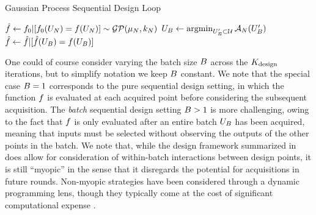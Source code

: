 \documentclass[12pt]{article}
\begin{document}
\begin{algorithm}
    \caption{Gaussian Process Sequential Design Loop}
    \label{alg:seq_des_loop}
    \begin{algorithmic}[1] %
	\State $\hat{\func} \gets \funcPrior|[\funcPrior(\designIn[\Ndesign]) = \func(\designIn[\Ndesign])] \sim \GP(\gpMean[\Ndesign], \gpKer[\Ndesign])$
         
        		\State $\designBatchIn \gets \argmin_{\designBatchIn^\prime \subset \parSpace} \acq[\Ndesign](\designBatchIn^\prime)$ 
		\State $\hat{f} \gets \hat{f} | [\hat{f}(\designBatchIn) = \func(\designBatchIn)]$
	\EndFor
	\EndFunction
    \end{algorithmic}
\end{algorithm}

One could of course consider 
varying the batch size $\Nbatch$ across the $\Nrounds$ iterations, but to simplify notation we keep $\Nbatch$ constant. We note that the 
special case $\Nbatch = 1$ corresponds to the pure sequential design setting, in which the function $\func$ is evaluated at each acquired 
point before considering the subsequent acquisition. The \textit{batch} sequential design setting $\Nbatch > 1$ is more challenging,  
owing to the fact that $\func$ is only evaluated after an entire batch $\designBatchIn$ has been acquired, meaning that inputs must 
be selected without observing the outputs of the other points in the batch. 
We note that, while the design framework summarized in  does allow for consideration 
of within-batch interactions between design points, 
it is still ``myopic'' in the sense that it disregards the potential for acquisitions in future rounds. 
Non-myopic strategies have been considered
through a dynamic programming lens, though they typically come at the cost of significant 
computational expense \cite{SURThesis, supermartingaleSUR}.
\end{document}
